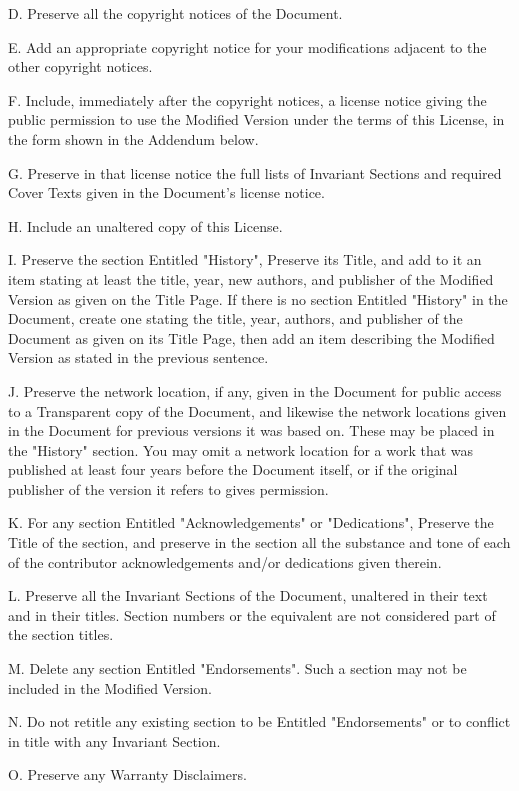 \documentclass[a4paper,11pt]{report}
\begin{document}
{ D. Preserve all the copyright notices of the Document. 

 E. Add an appropriate copyright notice for your modifications adjacent to the
other copyright notices. 

 F. Include, immediately after the copyright notices, a license notice giving
the public permission to use the Modified Version under the terms of this
License, in the form shown in the Addendum below. 

 G. Preserve in that license notice the full lists of Invariant Sections and
required Cover Texts given in the Document's license notice. 

 H. Include an unaltered copy of this License. 

 I. Preserve the section Entitled "History", Preserve its Title, and add to it
an item stating at least the title, year, new authors, and publisher of the
Modified Version as given on the Title Page. If there is no section Entitled
"History" in the Document, create one stating the title, year, authors, and
publisher of the Document as given on its Title Page, then add an item
describing the Modified Version as stated in the previous sentence. 

 J. Preserve the network location, if any, given in the Document for public
access to a Transparent copy of the Document, and likewise the network
locations given in the Document for previous versions it was based on. These
may be placed in the "History" section. You may omit a network location for a
work that was published at least four years before the Document itself, or if
the original publisher of the version it refers to gives permission. 

 K. For any section Entitled "Acknowledgements" or "Dedications", Preserve the
Title of the section, and preserve in the section all the substance and tone
of each of the contributor acknowledgements and/or dedications given therein. 

 L. Preserve all the Invariant Sections of the Document, unaltered in their
text and in their titles. Section numbers or the equivalent are not considered
part of the section titles. 

 M. Delete any section Entitled "Endorsements". Such a section may not be
included in the Modified Version. 

 N. Do not retitle any existing section to be Entitled "Endorsements" or to
conflict in title with any Invariant Section. 

 O. Preserve any Warranty Disclaimers. 

}
\end{document}
